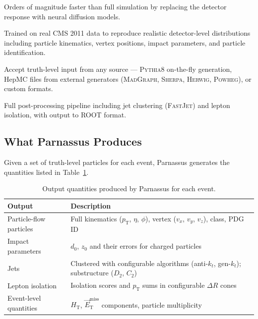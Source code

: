 \documentclass[11pt,a4paper]{article}
\begin{document}
\begin{description}[style=nextline,leftmargin=2.5cm]
  \item[\textbf{Speed}] Orders of magnitude faster than full simulation by replacing the
    detector response with neural diffusion models.
  \item[\textbf{Fidelity}] Trained on real CMS 2011 data to reproduce realistic
    detector-level distributions including particle kinematics, vertex positions,
    impact parameters, and particle identification.
  \item[\textbf{Flexibility}] Accept truth-level input from any source --- \textsc{Pythia8}
    on-the-fly generation, HepMC files from external generators (\textsc{MadGraph},
    \textsc{Sherpa}, \textsc{Herwig}, \textsc{Powheg}), or custom formats.
  \item[\textbf{Completeness}] Full post-processing pipeline including jet clustering
    (\textsc{FastJet}) and lepton isolation, with output to ROOT format.
\end{description}

\subsection{What Parnassus Produces}

Given a set of truth-level particles for each event, Parnassus generates the quantities
listed in Table~\ref{tab:outputs}.

\begin{table}[H]
\centering
\caption{Output quantities produced by Parnassus for each event.}
\label{tab:outputs}
\begin{tabular}{@{}ll@{}}
\toprule
\textbf{Output} & \textbf{Description} \\
\midrule
Particle-flow particles & Full kinematics ($p_\mathrm{T}$, $\eta$, $\phi$), vertex
  ($v_x$, $v_y$, $v_z$), class, PDG\,ID \\
Impact parameters & $d_0$, $z_0$ and their errors for charged particles \\
Jets & Clustered with configurable algorithms (anti-$k_t$, gen-$k_t$);
  substructure ($D_2$, $C_2$) \\
Lepton isolation & Isolation scores and $p_\mathrm{T}$ sums in configurable
  $\Delta R$ cones \\
Event-level quantities & $H_\mathrm{T}$, $\vec{E}_\mathrm{T}^\mathrm{miss}$
  components, particle multiplicity \\
\bottomrule
\end{tabular}
\end{table}
\end{document}
